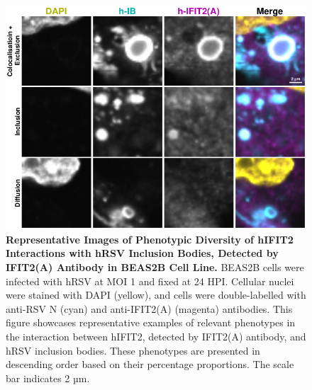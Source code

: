 \begin{figure}
    \centering
    \includegraphics[width=1\linewidth]{08. Chapter 3/Figs/02. Infection/02. IFIT2/01. IFIT2A/12. i2a beas2b.pdf} 
    \caption[Representative Images of Phenotypic Diversity of hIFIT2 Interactions with hRSV Inclusion Bodies, Detected by IFIT2(A) Antibody in BEAS2B Cell Line.]{\textbf{Representative Images of Phenotypic Diversity of hIFIT2 Interactions with hRSV Inclusion Bodies, Detected by IFIT2(A) Antibody in BEAS2B Cell Line.} BEAS2B cells were infected with hRSV at MOI 1 and fixed at 24 HPI. Cellular nuclei were stained with DAPI (yellow), and cells were double-labelled with anti-RSV N (cyan) and anti-IFIT2(A) (magenta) antibodies. This figure showcases representative examples of relevant phenotypes in the interaction between hIFIT2, detected by IFIT2(A) antibody, and hRSV inclusion bodies. These phenotypes are presented in descending order based on their percentage proportions. The scale bar indicates 2 µm.}
    \label{fig:Representative Images of Phenotypic Diversity of hIFIT2 Interactions with hRSV Inclusion Bodies, Detected by IFIT2(A) Antibody in BEAS2B Cell Line}
\end{figure}

